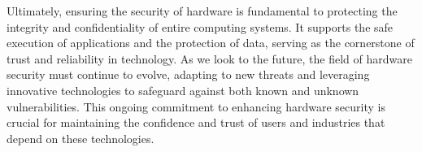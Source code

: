 Ultimately, ensuring the security of hardware is fundamental to protecting the integrity and confidentiality of entire computing systems. It supports the safe execution of applications and the protection of data, serving as the cornerstone of trust and reliability in technology. As we look to the future, the field of hardware security must continue to evolve, adapting to new threats and leveraging innovative technologies to safeguard against both known and unknown vulnerabilities. This ongoing commitment to enhancing hardware security is crucial for maintaining the confidence and trust of users and industries that depend on these technologies.